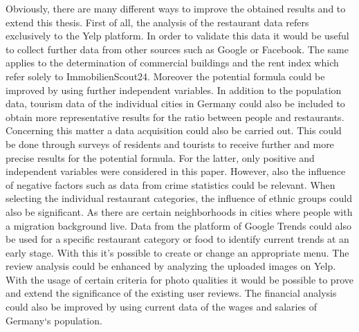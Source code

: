 Obviously, there are many different ways to improve the obtained results and to extend this thesis. First of all, the analysis of the restaurant data refers exclusively to the Yelp platform. In order to validate this data it would be useful to collect further data from other sources such as Google or Facebook. The same applies to the determination of commercial buildings and the rent index which refer solely to ImmobilienScout24. \newline
Moreover the potential formula could be improved by using further independent variables. In addition to the population data, tourism data of the individual cities in Germany could also be included to obtain more representative results for the ratio between people and restaurants. Concerning this matter a data acquisition could also be carried out. This could be done through surveys of residents and tourists to receive further and more precise results for the potential formula. For the latter, only positive and independent variables were considered in this paper. However, also the influence of negative factors such as data from crime statistics could be relevant. \newline
When selecting the individual restaurant categories, the influence of ethnic groups could also be significant. As there are certain neighborhoods in cities where people with a migration background live. Data from the platform of Google Trends could also be used for a specific restaurant category or food to identify current trends at an early stage. With this it's possible to create or change an appropriate menu. \newline
The review analysis could be enhanced by analyzing the uploaded images on Yelp. With the usage of certain criteria for photo qualities it would be possible to prove and extend the significance of the existing user reviews. The financial analysis could also be improved by using current data of the wages and salaries of Germany‘s population.


